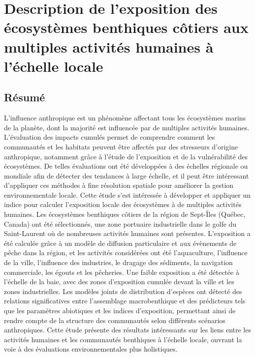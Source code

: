 \chapter{Description de l'exposition des écosystèmes benthiques côtiers aux multiples activités humaines à l'échelle locale}
\label{chap3}

\section{Résumé}
L'influence anthropique est un phénomène affectant tous les écosystèmes marins de la planète, dont la majorité est influencée par de multiples activités humaines. L'évaluation des impacts cumulés permet de comprendre comment les communautés et les habitats peuvent être affectés par des stresseurs d'origine anthropique, notamment grâce à l'étude de l'exposition et de la vulnérabilité des écosystèmes. De telles évaluations ont été développées à des échelles régionale ou mondiale afin de détecter des tendances à large échelle, et il peut être intéressant d'appliquer ces méthodes à fine résolution spatiale pour améliorer la gestion environnementale locale. Cette étude s'est intéressée à développer et appliquer un indice pour calculer l'exposition locale des écosystèmes à de multiples activités humaines. Les écosystèmes benthiques côtiers de la région de Sept-Îles (Québec, Canada) ont été sélectionnés, une zone portuaire industrielle dans le golfe du Saint-Laurent où de nombreuses activités humaines sont présentes. L'exposition a été calculée grâce à un modèle de diffusion particulaire et aux évènements de pêche dans la région, et les activités considérées ont été l'aquaculture, l'influence de la ville, l'influence des industries, le dragage des sédiments, la navigation commerciale, les égouts et les pêcheries. Une faible exposition a été détectée à l'échelle de la baie, avec des zones d'exposition cumulée devant la ville et les zones industrielles. Les modèles joints de distribution d'espèces ont détecté des relations significatives entre l'assemblage macrobenthique et des prédicteurs tels que les paramètres abiotiques et les indices d'exposition, permettant ainsi de rendre compte de la structure des communautés selon différents scénarios anthropiques. Cette étude présente des résultats intéressants sur les liens entre les activités humaines et les communautés benthiques à l'échelle locale, ouvrant la voie à des évaluations environnementales plus holistiques. \linebreak[4]

